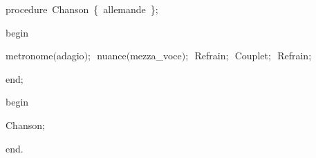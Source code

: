 {\pagebreak[3] 
\vspace{\neglskip}\mbox{\blc  \blk\idt  \mcl procedure\idt \ Chanson\ \cmt  \{\ allemande\ \}\idt $;$}\par 
\vspace{\neglskip}\mbox{\blc  \blk\idt  \mcl begin\idt }\par 
\vspace{\neglskip}\mbox{\blc  \blk\blk\idt  metronome$($adagio$)$$;$\ nuance$($mezza\_voce$)$$;$\ Refrain$;$\ Couplet$;$\ Refrain$;$\ }\par 
\vspace{\neglskip}\mbox{\blc  \blk\idt  \mcl end\idt $;$\ }\par 
\medskip

\vspace{\neglskip}\mbox{\blc  \idt  \mcl begin\idt }\par 
\vspace{\neglskip}\mbox{\blc  \blk\idt  Chanson$;$}\par 
\vspace{\neglskip}\mbox{\blc  \idt  \mcl end\idt $.$}\par 

\medskip }

